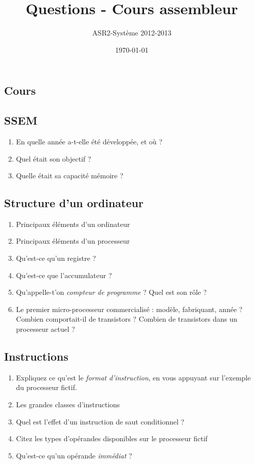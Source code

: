 \documentclass[10pt]{article}
\title{Questions - Cours assembleur}
\author{ASR2-Système 2012-2013}
\date{\today}
\begin{document}
\begin{multicols*}{2}
\maketitle

\section{Cours}

\subsection{SSEM}
\begin{enumerate}
\item En quelle année a-t-elle été développée, et où ?
\item Quel était son objectif ?
\item Quelle était sa capacité mémoire ?
\end{enumerate}

\subsection{Structure d'un ordinateur}

\begin{enumerate}
\item Principaux éléments d'un ordinateur
\item Principaux éléments d'un processeur
\item Qu'est-ce qu'un registre ?
\item Qu'est-ce que l'accumulateur ?
\item Qu'appelle-t'on \emph{compteur de programme} ? Quel est son rôle ?
\item Le premier micro-processeur commercialisé : modèle, fabriquant,
  année ? Combien comportait-il de transistors ?  Combien de
  transistors dans un processeur actuel ?
\end{enumerate}


\subsection{Instructions}
\begin{enumerate}
\item Expliquez ce qu'est le \emph{format d'instruction}, en vous appuyant
sur l'exemple du processeur fictif.
\item Les grandes classes d'instructions
\item Quel est l'effet d'un instruction de saut conditionnel ?
\item Citez les types d'opérandes disponibles sur le processeur fictif
\item Qu'est-ce qu'un opérande \emph{immédiat} ?
\end{enumerate}


\end{multicols*}
\end{document}
